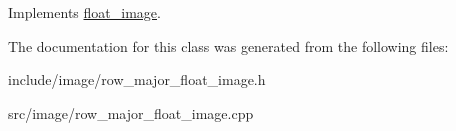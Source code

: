 Implements \hyperlink{classfloat__image_a62e1446efb51fadcfeebf50568f9d1e9}{float\-\_\-image}.



The documentation for this class was generated from the following files\-:\begin{DoxyCompactItemize}
\item 
include/image/row\-\_\-major\-\_\-float\-\_\-image.\-h\item 
src/image/row\-\_\-major\-\_\-float\-\_\-image.\-cpp\end{DoxyCompactItemize}
